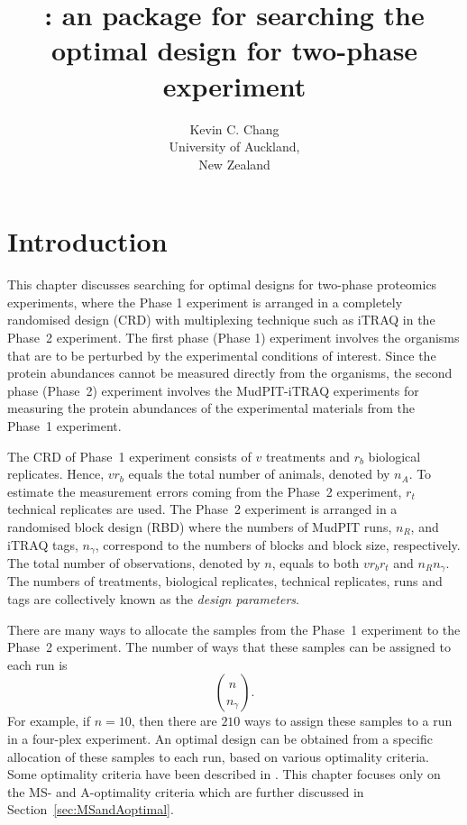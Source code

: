 \documentclass[article]{jss}
\author{Kevin C. Chang\\University of Auckland,\\ New Zealand}
\title{\pkg{optimTE}: an \proglang{R} package for searching the optimal design for two-phase experiment}
\begin{document}
\section[Introduction]{Introduction}
This chapter discusses searching for optimal designs for two-phase proteomics experiments, where the Phase 1 experiment is arranged in a completely randomised design (CRD) with multiplexing technique such as iTRAQ in the Phase~2 experiment. The first phase (Phase 1) experiment involves the organisms that are to be perturbed by the experimental conditions of interest. Since the protein abundances cannot be measured directly from the organisms, the second phase (Phase~2) experiment involves the MudPIT-iTRAQ\textsuperscript{\texttrademark} experiments for measuring the protein abundances of the experimental materials from the Phase~1 experiment. 

The CRD of Phase~1 experiment consists of $v$ treatments and $r_b$ biological replicates. Hence, $v r_b$ equals the total number of animals, denoted by $n_A$. To estimate the measurement errors coming from the Phase~2 experiment, $r_t$ technical replicates are used. The Phase~2 experiment is arranged in a randomised block design (RBD) where the numbers of MudPIT runs, $n_R$, and iTRAQ tags, $n_\gamma$, correspond to the numbers of blocks and block size, respectively. The total number of observations, denoted by $n$, equals to both $v r_b r_t$ and $n_R n_\gamma$. The numbers of treatments, biological replicates, technical replicates, runs and tags are collectively known as the \emph{design parameters}.  

There are many ways to allocate the samples from the Phase~1 experiment to the Phase~2 experiment. The number of ways that these samples can be assigned to each run is 
\[
\binom {n} {n_\gamma}.
\]
For example, if $n=10$, then there are $210$ ways to assign these samples to a run in a four-plex experiment. An optimal design can be obtained from a specific allocation of these samples to each run, based on various optimality criteria. Some optimality criteria have been described in \citep{John1987}. This chapter focuses only on the MS- and A-optimality criteria which are further discussed in Section~\ref{sec:MSandAoptimal}.
\end{document}
